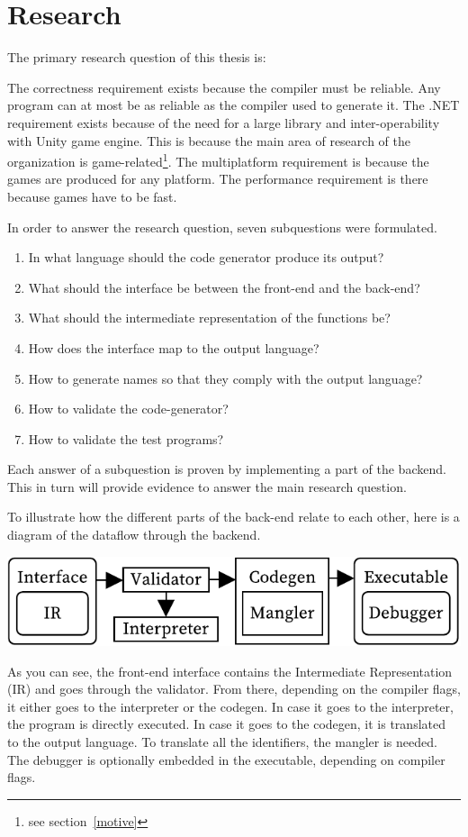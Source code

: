 \section{Research}\label{research}

The primary research question of this thesis is:



The correctness requirement exists because the compiler must be reliable.
Any program can at most be as reliable as the compiler used to generate it.
\label{whydotnet}
The .NET requirement exists because of the need for a large library and inter-operability with Unity game engine.
This is because the main area of research of the organization is game-related\footnote{see section~\ref{motive}}.
The multiplatform requirement is because the games are produced for any platform.
The performance requirement is there because games have to be fast.

In order to answer the research question, seven subquestions were formulated.

\begin{enumerate}
    \item In what language should the code generator produce its output?
    \item What should the interface be between the front-end and the back-end?
    \item What should the intermediate representation of the functions be?
    \item How does the interface map to the output language?
    \item How to generate names so that they comply with the output language?
    \item How to validate the code-generator?
    \item How to validate the test programs?
\end{enumerate}

Each answer of a subquestion is proven by implementing a part of the backend. 
This in turn will provide evidence to answer the main research question.

To illustrate how the different parts of the back-end relate to each other, here is a diagram of the dataflow through the backend.

\includegraphics[width=\columnwidth]{overview}

As you can see, the front-end interface contains the Intermediate Representation (IR) and goes through the validator.
From there, depending on the compiler flags, it either goes to the interpreter or the codegen.
In case it goes to the interpreter, the program is directly executed.
In case it goes to the codegen, it is translated to the output language.
To translate all the identifiers, the mangler is needed.
The debugger is optionally embedded in the executable, depending on compiler flags.

